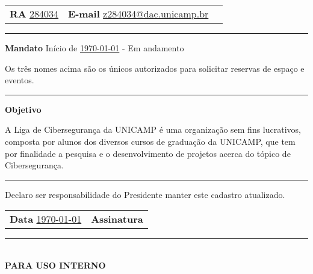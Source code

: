 \documentclass[10pt, a4paper]{article}
\begin{document}
\vspace{0.1cm}
\begin{tabularx}{\textwidth}{@{}X X X@{}}
    \textbf{RA} \hspace{0.5cm} \underline{284034} &
    \textbf{E-mail} \hspace{0.5cm} \underline{z284034@dac.unicamp.br}
\end{tabularx}

\vspace{0.1cm}
\hrule
\vspace{0.2cm}

\textbf{Mandato} Início de \underline{\today}{} - Em andamento

\vspace{0.3cm}
{\scriptsize Os três nomes acima são os únicos autorizados para solicitar reservas de espaço e eventos.}

\vspace{0.2cm}
\hrule
\vspace{0.2cm}

\textbf{Objetivo}

\vspace{0.1cm}
{\footnotesize
    A Liga de Cibersegurança da UNICAMP é uma organização sem fins lucrativos, composta por alunos dos diversos cursos de graduação da UNICAMP, que tem por finalidade a pesquisa e o desenvolvimento de projetos acerca do tópico de Cibersegurança.
}

\vspace{0.3cm}
\hrule
\vspace{0.3cm}

{\footnotesize Declaro ser responsabilidade do Presidente manter este cadastro atualizado.}

\vspace{0.2cm}

\begin{tabularx}{\textwidth}{@{}p{6cm} X@{}}
    \textbf{Data} \hspace{0.5cm} \underline{\today}{} & \textbf{Assinatura} \hspace{0.5cm} \underline{\hspace{3.5cm}} \\
\end{tabularx}

\vspace{0.2cm}
\begin{center}
    \rule{\textwidth}{1pt} \\
    \textbf{PARA USO INTERNO}
\end{center}
\end{document}
